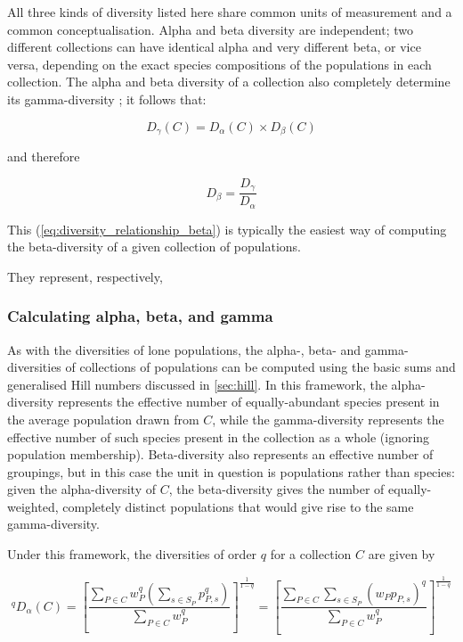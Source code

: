 All three kinds of diversity listed here share common units of measurement and a common conceptualisation. Alpha and beta diversity are independent; two different collections can have identical alpha and very different beta, or vice versa, depending on the exact species compositions of the populations in each collection. The alpha and beta diversity of a collection also completely determine its gamma-diversity \citep{jost2007partitioning}; it follows that:

\begin{equation}
D_\gamma(C) = D_\alpha(C) \times D_\beta(C)
\label{eq:diversity_relationship_gamma}
\end{equation}

and therefore 

\begin{equation}
D_\beta = \frac{D_\gamma}{D_\alpha}
\label{eq:diversity_relationship_beta}
\end{equation}

This (\autoref{eq:diversity_relationship_beta}) is typically the easiest way of computing the beta-diversity of a given collection of populations.

They represent, respectively, 

\subsubsection{Calculating alpha, beta, and gamma}
\label{sec:diversity_calc}

As with the diversities of lone populations, the alpha-, beta- and gamma-diversities of collections of populations can be computed using the basic sums and generalised Hill numbers discussed in \ref{sec:hill}. In this framework, the alpha-diversity represents the effective number of equally-abundant species present in the average population drawn from $C$, while the gamma-diversity represents the effective number of such species present in the collection as a whole (ignoring population membership). Beta-diversity also represents an effective number of groupings, but in this case the unit in question is populations rather than species: given the alpha-diversity of $C$, the beta-diversity gives the number of equally-weighted, completely distinct populations that would give rise to the same gamma-diversity.

Under this framework, the diversities of order $q$ for a collection $C$ are given by

\begin{equation}
^qD_\alpha(C)
= \left[\frac{\displaystyle\sum_{P \in C} w_P^q \left(\sum_{s \in S_P} p_{P,s}^q\right)}{\displaystyle\sum_{P \in C} w_P^q}\right]^\frac{1}{1-q}
= \left[\frac{\displaystyle\sum_{P \in C}\sum_{s \in S_P} (w_Pp_{P,s})^q}{\displaystyle\sum_{P \in C} w_P^q}\right]^\frac{1}{1-q}
\label{eq:diversity_alpha}
\end{equation} %

